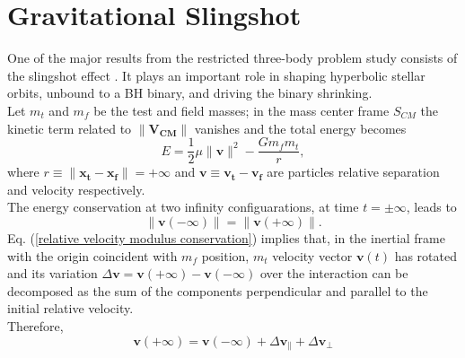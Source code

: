 \section{Gravitational Slingshot}\label{sec:Gravitational Slingshot Effect}
One of the major results from the restricted three-body problem study consists of the slingshot effect \cite{Mikkola_1992}. It plays an important role in shaping hyperbolic stellar orbits, unbound to a BH binary, and driving the binary shrinking.\\Let $m_t$ and $m_f$ be the test and field masses; in the mass center frame $S_{CM}$ the kinetic term related to $\|\mathbf{V_{CM}}\|$ vanishes and the total energy becomes
\begin{equation}\label{E in S_cm }
    E=\frac{1}{2}\mu\|\mathbf{v}\|^2-\frac{Gm_fm_t}{r},
\end{equation}
 where  $r\equiv \|\mathbf{x_t}-\mathbf{x_f}\|=+\infty$ and $\mathbf{v}\equiv \mathbf{v_t}-\mathbf{v_f}$ are particles relative separation and velocity respectively.\\The energy conservation at two infinity configuarations, at time $t=\pm \infty$, leads to 
\begin{equation}\label{relative velocity modulus conservation}
     \|\mathbf{v}(-\infty)\|=  \|\mathbf{v}(+\infty)\|.
\end{equation}
Eq. (\ref{relative velocity modulus conservation}) implies that, in the inertial frame with the origin coincident with $m_f$ position, $m_t$ velocity vector $\mathbf{v}(t)$ has rotated and its variation $\Delta\mathbf{v}=\mathbf{v}(+\infty)-\mathbf{v}(-\infty)$ over the interaction can be decomposed  as the sum of the components perpendicular
and parallel to the initial relative velocity.\\Therefore, 
\begin{equation}
    \mathbf{v}(+\infty)=\mathbf{v}(-\infty)+\Delta\mathbf{v}_\parallel +\Delta\mathbf{v}_\perp
\end{equation}


